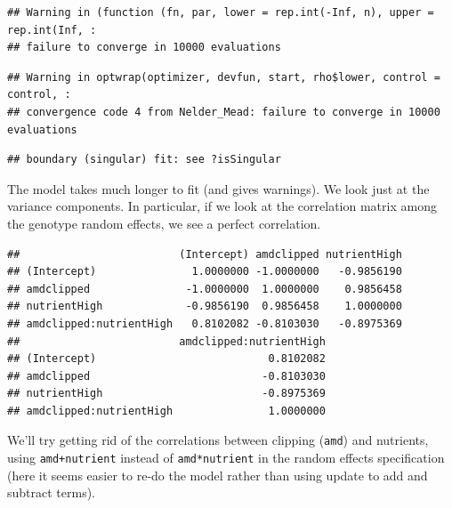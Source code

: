 \documentclass[
  12pt,
]{book}
\newenvironment{Shaded}{\begin{snugshade}}{\end{snugshade}}
\newcommand{\KeywordTok}[1]{\textcolor[rgb]{0.13,0.29,0.53}{\textbf{#1}}}
\newcommand{\NormalTok}[1]{#1}
\newcommand{\OperatorTok}[1]{\textcolor[rgb]{0.81,0.36,0.00}{\textbf{#1}}}
\newcommand{\StringTok}[1]{\textcolor[rgb]{0.31,0.60,0.02}{#1}}
\begin{document}
\begin{verbatim}
## Warning in (function (fn, par, lower = rep.int(-Inf, n), upper = rep.int(Inf, :
## failure to converge in 10000 evaluations
\end{verbatim}

\begin{verbatim}
## Warning in optwrap(optimizer, devfun, start, rho$lower, control = control, :
## convergence code 4 from Nelder_Mead: failure to converge in 10000 evaluations
\end{verbatim}

\begin{verbatim}
## boundary (singular) fit: see ?isSingular
\end{verbatim}

The model takes much longer to fit (and gives warnings).
We look just at the variance components. In particular, if we look at the correlation matrix among the genotype random effects, we see a perfect
correlation.

\begin{Shaded}
\end{Shaded}

\begin{verbatim}
##                         (Intercept) amdclipped nutrientHigh
## (Intercept)               1.0000000 -1.0000000   -0.9856190
## amdclipped               -1.0000000  1.0000000    0.9856458
## nutrientHigh             -0.9856190  0.9856458    1.0000000
## amdclipped:nutrientHigh   0.8102082 -0.8103030   -0.8975369
##                         amdclipped:nutrientHigh
## (Intercept)                           0.8102082
## amdclipped                           -0.8103030
## nutrientHigh                         -0.8975369
## amdclipped:nutrientHigh               1.0000000
\end{verbatim}

We'll try getting rid of the correlations between clipping (\texttt{amd}) and nutrients, using \texttt{amd+nutrient} instead of \texttt{amd*nutrient} in the random effects specification (here it seems easier to re-do the model rather than using update to add and subtract terms).
\end{document}
